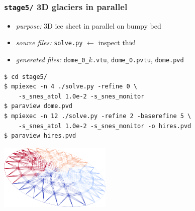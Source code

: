 \documentclass[10pt,
               hyperref={colorlinks,citecolor=DeepPink4,linkcolor=black,urlcolor=blue},
               svgnames]{beamer}
\begin{document}
\begin{frame}[fragile]
\frametitle{\texttt{stage5/} \qquad 3D glaciers in parallel}

\begin{itemize}
\item \emph{purpose:} 3D ice sheet in parallel on bumpy bed
\item \emph{source files:} \texttt{solve.py} \hfill \alert{$\gets$ inspect this!}
\item \emph{generated files:} \texttt{dome\_0\_}$k$\texttt{.vtu}, \texttt{dome\_0.pvtu}, \texttt{dome.pvd}
\end{itemize}

\bigskip
\begin{Verbatim}
$ cd stage5/
$ mpiexec -n 4 ./solve.py -refine 0 \
    -s_snes_atol 1.0e-2 -s_snes_monitor
$ paraview dome.pvd
$ mpiexec -n 12 ./solve.py -refine 2 -baserefine 5 \
    -s_snes_atol 1.0e-2 -s_snes_monitor -o hires.pvd
$ paraview hires.pvd
\end{Verbatim}

\bigskip
\begin{center}
\includegraphics[width=0.4\textwidth]{figs/stage5.png}
\end{center}
\end{frame}
\end{document}

